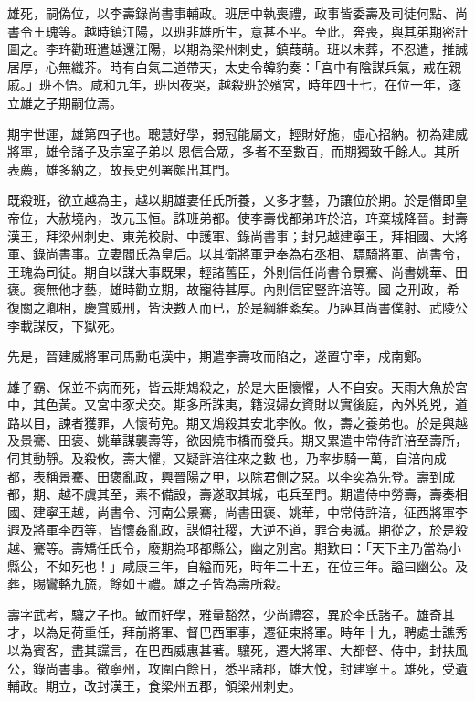 \begin{pinyinscope}
 雄死，嗣偽位，以李壽錄尚書事輔政。班居中執喪禮，政事皆委壽及司徒何點、尚書令王瑰等。越時鎮江陽，以班非雄所生，意甚不平。至此，奔喪，與其弟期密計圖之。李玝勸班遣越還江陽，以期為梁州刺史，鎮葭萌。班以未葬，不忍遣，推誠居厚，心無纖芥。時有白氣二道帶天，太史令韓豹奏：「宮中有陰謀兵氣，戒在親戚。」班不悟。咸和九年，班因夜哭，越殺班於殯宮，時年四十七，在位一年，遂立雄之子期嗣位焉。



 期字世運，雄第四子也。聰慧好學，弱冠能屬文，輕財好施，虛心招納。初為建威將軍，雄令諸子及宗室子弟以
 恩信合眾，多者不至數百，而期獨致千餘人。其所表薦，雄多納之，故長史列署頗出其門。



 既殺班，欲立越為主，越以期雄妻任氏所養，又多才藝，乃讓位於期。於是僭即皇帝位，大赦境內，改元玉恒。誅班弟都。使李壽伐都弟玝於涪，玝棄城降晉。封壽漢王，拜梁州刺史、東羌校尉、中護軍、錄尚書事；封兄越建寧王，拜相國、大將軍、錄尚書事。立妻閻氏為皇后。以其衛將軍尹奉為右丞相、驃騎將軍、尚書令，王瑰為司徒。期自以謀大事既果，輕諸舊臣，外則信任尚書令景騫、尚書姚華、田褒。褒無他才藝，雄時勸立期，故寵待甚厚。內則信宦豎許涪等。國
 之刑政，希復關之卿相，慶賞威刑，皆決數人而已，於是綱維紊矣。乃誣其尚書僕射、武陵公李載謀反，下獄死。



 先是，晉建威將軍司馬勳屯漢中，期遣李壽攻而陷之，遂置守宰，戍南鄭。



 雄子霸、保並不病而死，皆云期鴆殺之，於是大臣懷懼，人不自安。天雨大魚於宮中，其色黃。又宮中豕犬交。期多所誅夷，籍沒婦女資財以實後庭，內外兇兇，道路以目，諫者獲罪，人懷茍免。期又鴆殺其安北李攸。攸，壽之養弟也。於是與越及景騫、田褒、姚華謀襲壽等，欲因燒市橋而發兵。期又累遣中常侍許涪至壽所，伺其動靜。及殺攸，壽大懼，又疑許涪往來之數
 也，乃率步騎一萬，自涪向成都，表稱景騫、田褒亂政，興晉陽之甲，以除君側之惡。以李奕為先登。壽到成都，期、越不虞其至，素不備設，壽遂取其城，屯兵至門。期遣侍中勞壽，壽奏相國、建寧王越，尚書令、河南公景騫，尚書田褒、姚華，中常侍許涪，征西將軍李遐及將軍李西等，皆懷姦亂政，謀傾社稷，大逆不道，罪合夷滅。期從之，於是殺越、騫等。壽矯任氏令，廢期為邛都縣公，幽之別宮。期歎曰：「天下主乃當為小縣公，不如死也！」咸康三年，自縊而死，時年二十五，在位三年。謚曰幽公。及葬，賜鸞輅九旒，餘如王禮。雄之子皆為壽所殺。



 壽字武考，驤之子也。敏而好學，雅量豁然，少尚禮容，異於李氏諸子。雄奇其才，以為足荷重任，拜前將軍、督巴西軍事，遷征東將軍。時年十九，聘處士譙秀以為賓客，盡其讜言，在巴西威惠甚著。驤死，遷大將軍、大都督、侍中，封扶風公，錄尚書事。徵寧州，攻圍百餘日，悉平諸郡，雄大悅，封建寧王。雄死，受遺輔政。期立，改封漢王，食梁州五郡，領梁州刺史。




\end{pinyinscope}
